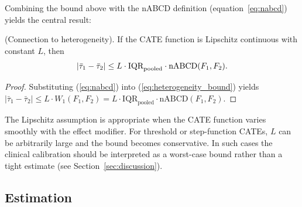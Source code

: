 \documentclass[AMA,Times1COL]{WileyNJDv5}
\begin{document}
Combining the bound above with the nABCD definition (equation~\ref{eq:nabcd}) yields the central result:

\begin{proposition}\label{prop:heterogeneity}
\textup{(Connection to heterogeneity).} If the CATE function is Lipschitz continuous with constant $L$, then
\begin{equation}
|\bar{\tau}_1 - \bar{\tau}_2| \leq L \cdot \text{IQR}_{\textup{pooled}} \cdot \text{nABCD}(F_1, F_2).
\label{eq:heterogeneity_nabcd}
\end{equation}
\end{proposition}

\begin{proof}
Substituting (\ref{eq:nabcd}) into (\ref{eq:heterogeneity_bound}) yields $|\bar{\tau}_1 - \bar{\tau}_2| \leq L \cdot W_1(F_1, F_2) = L \cdot \text{IQR}_{\text{pooled}} \cdot \text{nABCD}(F_1, F_2)$.
\end{proof}

\noindent The Lipschitz assumption is appropriate when the CATE function varies smoothly with the effect modifier. For threshold or step-function CATEs, $L$ can be arbitrarily large and the bound becomes conservative. In such cases the clinical calibration should be interpreted as a worst-case bound rather than a tight estimate (see Section~\ref{sec:discussion}).

\subsection{Estimation}\label{sec:estimation}
\end{document}
